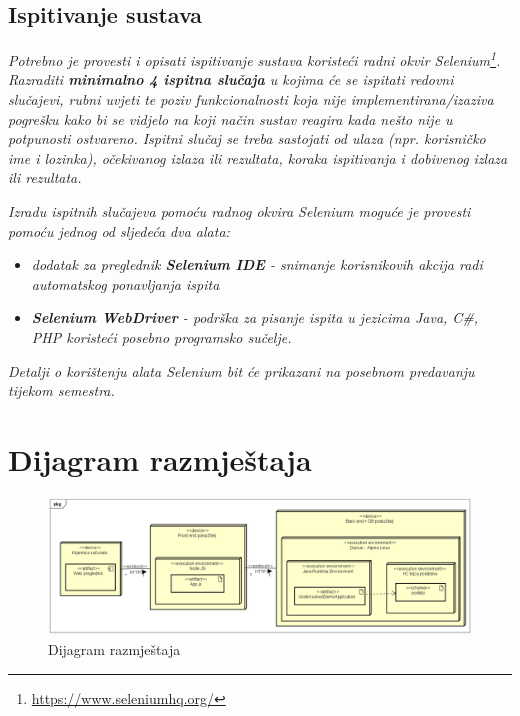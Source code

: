 			
			
			\subsection{Ispitivanje sustava}
			
			 \textit{Potrebno je provesti i opisati ispitivanje sustava koristeći radni okvir Selenium\footnote{\url{https://www.seleniumhq.org/}}. Razraditi \textbf{minimalno 4 ispitna slučaja} u kojima će se ispitati redovni slučajevi, rubni uvjeti te poziv funkcionalnosti koja nije implementirana/izaziva pogrešku kako bi se vidjelo na koji način sustav reagira kada nešto nije u potpunosti ostvareno. Ispitni slučaj se treba sastojati od ulaza (npr. korisničko ime i lozinka), očekivanog izlaza ili rezultata, koraka ispitivanja i dobivenog izlaza ili rezultata.\\ }
			 
			 \textit{Izradu ispitnih slučajeva pomoću radnog okvira Selenium moguće je provesti pomoću jednog od sljedeća dva alata:}
			 \begin{itemize}
			 	\item \textit{dodatak za preglednik \textbf{Selenium IDE} - snimanje korisnikovih akcija radi automatskog ponavljanja ispita	}
			 	\item \textit{\textbf{Selenium WebDriver} - podrška za pisanje ispita u jezicima Java, C\#, PHP koristeći posebno programsko sučelje.}
			 \end{itemize}
		 	\textit{Detalji o korištenju alata Selenium bit će prikazani na posebnom predavanju tijekom semestra.}
			
			\eject 
		
		
		\section{Dijagram razmještaja}
			
			
			\begin{figure}[H]
				\includegraphics[scale=0.35]{slike/dijagram_razmjestaja.png} %
				\centering
				\caption{Dijagram razmještaja}
				\label{fig:Dijagram razmještaja}
			\end{figure}
			\eject 
		
